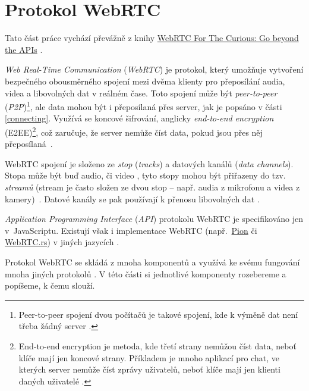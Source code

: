 \section{Protokol WebRTC}\label{webRTC}

Tato část práce vychází převážně z knihy
\href{https://webrtcforthecurious.com/}{WebRTC For The Curious: Go beyond the
    APIs} \parencite{WebRTCForTheCurious}.

\textit{Web Real-Time Communication} (\textit{WebRTC}) je protokol, který
umožňuje vytvoření bezpečného obousměrného spojení mezi dvěma klienty pro
přeposílání audia, videa a libovolných dat v reálném čase. Toto spojení může být
\textit{peer-to-peer} (\textit{P2P})\footnote{Peer-to-peer spojení dvou počítačů
    je takové spojení, kde k výměně dat není třeba žádný server
    \parencite{MerriamWebster-PeerToPeer}.}, ale data mohou být i přeposílaná přes
server, jak je popsáno v části \ref{connecting}. Využívá se koncové šifrování,
anglicky \textit{end-to-end encryption} (E2EE)\footnote{End-to-end encryption je
    metoda, kde třetí strany nemůžou číst data, neboť klíče mají jen koncové strany.
    Příkladem je mnoho aplikací pro chat, ve kterých server nemůže číst zprávy
    uživatelů, neboť klíče mají jen klienti daných uživatelé
    \parencite{IBM-EndToEndEncryption}.}, což zaručuje, že server nemůže číst data, pokud
jsou přes něj přeposílaná~\parencite{WebRTCForTheCurious}.

WebRTC spojení je složeno ze \textit{stop} (\textit{tracks}) a datových kanálů
(\textit{data channels}). Stopa může být buď audio, či video
\parencite{MDN-WebRTC-MediaStreamTrack}, tyto stopy mohou být přiřazeny do tzv.
\textit{streamů} (stream je často složen ze dvou stop -- např. audia z mikrofonu
a videa z kamery)~\parencite{MDN-WebRTC-MediaStream}. Datové kanály se pak používají
k přenosu libovolných dat \parencite{WebRTCORG-GettingStarted-DataChannels}.

\textit{Application Programming Interface} (\textit{API}) protokolu WebRTC je
specifikováno jen v~JavaScriptu. Existují však i implementace WebRTC
(např.~\href{https://github.com/pion/webrtc}{Pion} či
\href{https://github.com/webrtc-rs/webrtc}{WebRTC.rs}) v jiných jazycích
\parencite{WebRTCForTheCurious,GitHub-Pion-WebRTC,GitHub-WebRTCRS-WebRTC}.

Protokol WebRTC se skládá z mnoha komponentů a využívá ke svému fungování mnoha
jiných protokolů \parencite{WebRTCForTheCurious}. V této části si jednotlivé
komponenty rozebereme a popíšeme, k čemu slouží.

